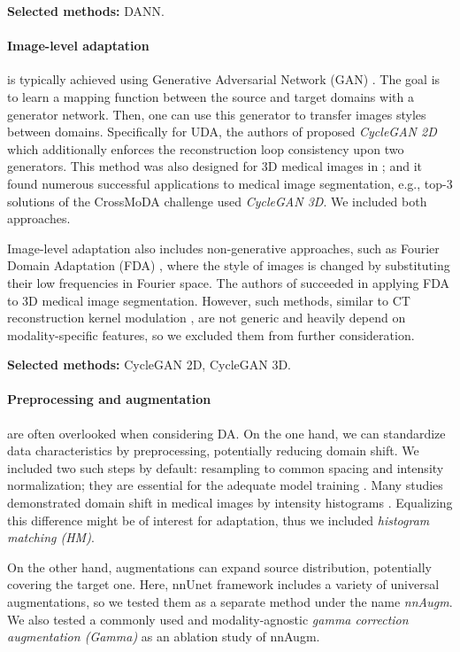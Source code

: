 \textbf{Selected methods:} DANN.


\paragraph{Image-level adaptation} is typically achieved using Generative Adversarial Network (GAN) \cite{goodfellow2020generative}. The goal is to learn a mapping function between the source and target domains with a generator network. Then, one can use this generator to transfer images styles between domains. Specifically for UDA, the authors of \cite{cyclegan} proposed \textit{CycleGAN 2D} which additionally enforces the reconstruction loop consistency upon two generators. This method was also designed for 3D medical images in \cite{cyclegan3d}; and it found numerous successful applications to medical image segmentation, e.g., top-3 solutions of the CrossMoDA challenge \cite{crossmoda} used \textit{CycleGAN 3D}. We included both approaches.

Image-level adaptation also includes non-generative approaches, such as Fourier Domain Adaptation (FDA) \cite{fda}, where the style of images is changed by substituting their low frequencies in Fourier space. The authors of \cite{fda_medim} succeeded in applying FDA to 3D medical image segmentation. However, such methods, similar to CT reconstruction kernel modulation \cite{fbpaug}, are not generic and heavily depend on modality-specific features, so we excluded them from further consideration.

\textbf{Selected methods:} CycleGAN 2D, CycleGAN 3D.


\paragraph{Preprocessing and augmentation} are often overlooked when considering DA. On the one hand, we can standardize data characteristics by preprocessing, potentially reducing domain shift. We included two such steps by default: resampling to common spacing and intensity normalization; they are essential for the adequate model training \cite{kondrateva2024negligible}. Many studies demonstrated domain shift in medical images by intensity histograms \cite{crossmoda,se_medim,ihf}. Equalizing this difference might be of interest for adaptation, thus we included \textit{histogram matching (HM)}.

On the other hand, augmentations can expand source distribution, potentially covering the target one. Here, nnUnet framework \cite{nnunet} includes a variety of universal augmentations, so we tested them as a separate method under the name \textit{nnAugm}. We also tested a commonly used and modality-agnostic \textit{gamma correction augmentation (Gamma)} as an ablation study of nnAugm.


